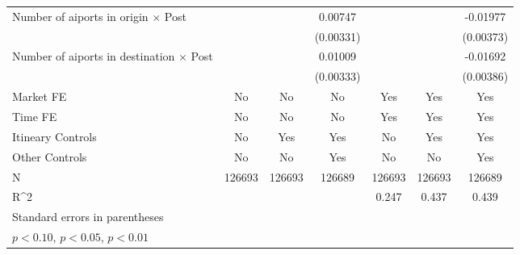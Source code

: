 \begin{table}[htbp]
\begin{tabular}{l*{6}{c}}
\addlinespace
Number of aiports in origin $\times$ Post&                     &                     &     0.00747\sym{**} &                     &                     &    -0.01977\sym{***}\\
                    &                     &                     &   (0.00331)         &                     &                     &   (0.00373)         \\
\addlinespace
Number of aiports in destination $\times$ Post&                     &                     &     0.01009\sym{***}&                     &                     &    -0.01692\sym{***}\\
                    &                     &                     &   (0.00333)         &                     &                     &   (0.00386)         \\
\midrule
Market FE           &          No         &          No         &          No         &         Yes         &         Yes         &         Yes         \\
Time FE             &          No         &          No         &          No         &         Yes         &         Yes         &         Yes         \\
Itineary Controls   &          No         &         Yes         &         Yes         &          No         &         Yes         &         Yes         \\
Other Controls      &          No         &          No         &         Yes         &          No         &          No         &         Yes         \\
N                   &      126693         &      126693         &      126689         &      126693         &      126693         &      126689         \\
R^2                 &                     &                     &                     &       0.247         &       0.437         &       0.439         \\
\bottomrule
\multicolumn{7}{l}{\footnotesize Standard errors in parentheses}\\
\multicolumn{7}{l}{\footnotesize \sym{*} \(p<0.10\), \sym{**} \(p<0.05\), \sym{***} \(p<0.01\)}\\
\end{tabular}
\end{table}
